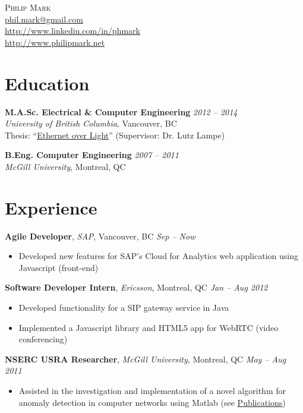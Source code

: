 \documentclass[letterpaper]{article}
\newcommand{\contact}[4]{
  \begin{center}
    {\LARGE \textsc {#1}}\\ \smallskip
    {\href{mailto:#2}{#2}}\\ \smallskip
    {\url{#3}}\\ \smallskip
    {\url{#4}}\\ \medskip
  \end{center}
}
\newcommand{\jobtitle}[4]{
  \textbf{#1}, \emph{#2}, {#3} \hfill \emph{#4}\\
}
\newenvironment{jobdescription}{
  \vspace{-4pt}
  \begin{itemize}
  \setlength{\itemsep}{2pt}
  \setlength{\parskip}{0pt}
  \setlength{\parsep}{0pt}
}{\end{itemize}}
\begin{document}

\contact{Philip Mark}{phil.mark@gmail.com}{http://www.linkedin.com/in/phmark}
{http://www.philipmark.net}

\section*{Education}
\textbf{M.A.Sc. Electrical \& Computer Engineering}
\hfill \emph{2012 -- 2014}{} \\
\emph{University of British Columbia}, Vancouver, BC \\
Thesis: ``\href{http://circle.ubc.ca/handle/2429/51772}{Ethernet over Light}'' 
(Supervisor: Dr. Lutz Lampe) \\
\medskip 

\textbf{B.Eng. Computer Engineering} \hfill \emph{2007 -- 2011} \\
\emph{McGill University}, Montreal, QC \\

\bigskip

\section*{Experience}
\jobtitle{Agile Developer}{SAP}{Vancouver, BC}{Sep -- Now}
\begin{jobdescription}
  \item Developed new features for SAP's Cloud for Analytics web application
  using Javascript (front-end)
\end{jobdescription}

\jobtitle{Software Developer Intern}{Ericsson}{Montreal, QC}{Jan -- Aug 2012}
\begin{jobdescription}
  \item Developed functionality for a SIP gateway service in Java
  \item Implemented a Javascript library and HTML5 app for WebRTC (video
  conferencing)
\end{jobdescription}

\jobtitle{NSERC USRA Researcher}{McGill University}{Montreal, QC}{May -- Aug
2011}
\begin{jobdescription}
  \item Assisted in the investigation and implementation of a novel
  algorithm for anomaly detection in computer networks using Matlab (see
  \hyperlink{sec:publications}{Publications})
\end{jobdescription}
\end{document}
